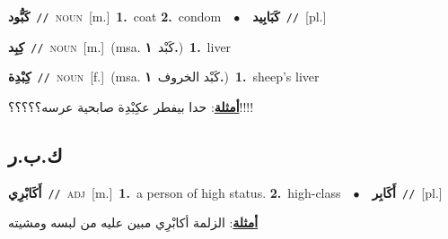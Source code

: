 \documentclass[10pt,a4paper,twoside]{article} %
\begin{document}
\begin{multicols}{2}
{\setlength\topsep{0pt}\textbf{\foreignlanguage{arabic}{كَبُّود}}\ {\color{gray}\texttt{//}\color{black}}\ \textsc{noun}\ [m.]\ \textbf{1.}~coat  \textbf{2.}~condom\ \ $\bullet$\ \ \setlength\topsep{0pt}\textbf{\foreignlanguage{arabic}{كَبَابِيد}}\ {\color{gray}\texttt{//}\color{black}}\ [pl.]\ } \vspace{2mm}

{\setlength\topsep{0pt}\textbf{\foreignlanguage{arabic}{كِبِد}}\ {\color{gray}\texttt{//}\color{black}}\ \textsc{noun}\ [m.]\ \color{gray}(msa. \foreignlanguage{arabic}{كَبْد}~\foreignlanguage{arabic}{\textbf{١.}})\color{black}\ \textbf{1.}~liver\ } \vspace{2mm}

{\setlength\topsep{0pt}\textbf{\foreignlanguage{arabic}{كِبْدِة}}\ {\color{gray}\texttt{//}\color{black}}\ \textsc{noun}\ [f.]\ \color{gray}(msa. \foreignlanguage{arabic}{كَبْد الخروف}~\foreignlanguage{arabic}{\textbf{١.}})\color{black}\ \textbf{1.}~sheep's liver\  \begin{flushright}\color{gray}\foreignlanguage{arabic}{\textbf{\underline{\foreignlanguage{arabic}{أمثلة}}}: حدا بيفطر عكِبْدِة صابحية عرسه؟؟؟؟؟!!!!}\end{flushright}\color{black}} \vspace{2mm}

\vspace{-3mm}
\subsection*{\color{blue}\foreignlanguage{arabic}{ك.ب.ر}\color{blue}{}} 

{\setlength\topsep{0pt}\textbf{\foreignlanguage{arabic}{أَكَابْرِي}}\ {\color{gray}\texttt{//}\color{black}}\ \textsc{adj}\ [m.]\ \textbf{1.}~a person of high status.  \textbf{2.}~high-class\ \ $\bullet$\ \ \setlength\topsep{0pt}\textbf{\foreignlanguage{arabic}{أَكَابِر}}\ {\color{gray}\texttt{//}\color{black}}\ [pl.]\  \begin{flushright}\color{gray}\foreignlanguage{arabic}{\textbf{\underline{\foreignlanguage{arabic}{أمثلة}}}: الزلمة أكابْرِي مبين عليه من لبسه ومشيته}\end{flushright}\color{black}} \vspace{2mm}


\end{multicols}
\end{document}
